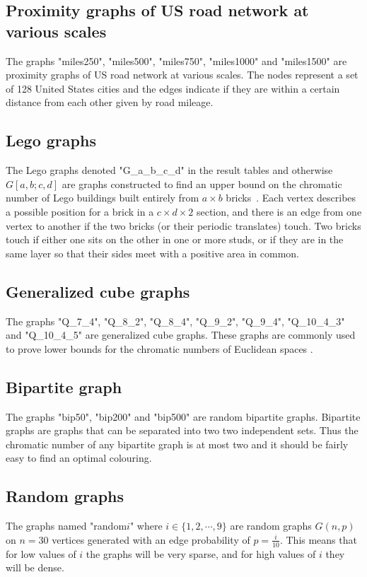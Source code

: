 \subsection{Proximity graphs of US road network at various scales}
The graphs "miles250", "miles500", "miles750", "miles1000" and "miles1500" are proximity graphs of US road network at various scales. The nodes represent a set of 128 United States cities and the edges indicate if they are within a certain distance from each other given by road mileage.
\subsection{Lego graphs}
The Lego graphs denoted "G\_a\_b\_c\_d" in the result tables and otherwise $G[a,b;c,d]$ are graphs constructed to find an upper bound on the chromatic number of Lego buildings built entirely from $a\times b$ bricks~\cite{Lego}. Each vertex describes a possible position for a brick in a $c\times d \times 2$ section, and there is an edge from one vertex to another if the two bricks (or their periodic translates) touch. Two bricks touch if either one sits on the other in one or more studs, or if they are in the same layer so that their sides meet with a positive area in common.
\subsection{Generalized cube graphs}
The graphs "Q\_7\_4", "Q\_8\_2", "Q\_8\_4", "Q\_9\_2", "Q\_9\_4", "Q\_10\_4\_3" and "Q\_10\_4\_5" are generalized cube graphs. These graphs are commonly used to prove lower bounds for the chromatic numbers of Euclidean spaces \cite{kahle2015new}. 
\subsection{Bipartite graph}  
The graphs "bip50", "bip200" and "bip500" are random bipartite graphs. Bipartite graphs are graphs that can be separated into two two independent sets. Thus the chromatic number of any bipartite graph is at most two and it should be fairly easy to find an optimal colouring.
\subsection{Random graphs}
The graphs named "random$i$" where $i \in \{1,2,\cdots,9\}$ are random graphs $G(n,p)$ on $n=30$ vertices generated with an edge probability of $p=\frac{i}{10}$. This means that for low values of $i$ the graphs will be very sparse, and for high values of $i$ they will be dense.

